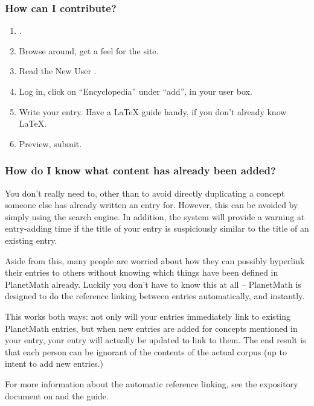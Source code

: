 \subsubsection*{How can I contribute?}
\begin{enumerate}
\item {}.
\item Browse around, get a feel for the site.
\item Read the New User .
\item Log in, click on ``Encyclopedia'' under ``add'', in your user box.
\item Write your entry. Have a \LaTeX{} guide handy, if you don't already know \LaTeX{}.
\item Preview, submit.
\end{enumerate}

\subsubsection*{How do I know what content has already been added?}
You don't really need to, other than to avoid directly duplicating a concept someone else has already written an entry for. However, this can be avoided by simply using the search engine. In addition, the system will provide a warning at entry-adding time if the title of your entry is suspiciously similar to the title of an existing entry.

Aside from this, many people are worried about how they can possibly hyperlink their entries to others without knowing which things have been defined in PlanetMath already. Luckily you don't have to know this at all -- PlanetMath is designed to do the reference linking between entries automatically, and instantly.

This works both ways: not only will your entries immediately link to existing PlanetMath entries, but when new entries are added for concepts mentioned in your entry, your entry will actually be updated to link to them. The end result is that each person can be ignorant of the contents of the actual corpus (up to intent to add new entries.)

For more information about the automatic reference linking, see the expository document on  and the  guide.

